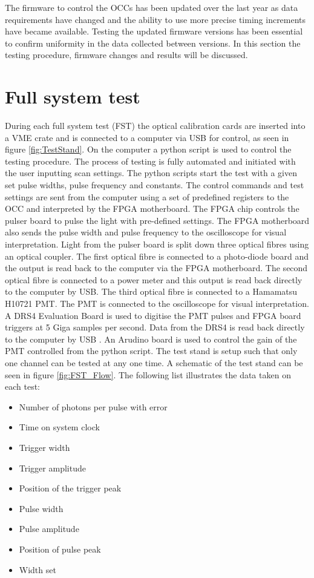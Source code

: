 The firmware to control the OCCs has been updated over the last year as data requirements have changed and the ability to use more precise timing increments have became available. Testing the updated firmware versions has been essential to confirm uniformity in the data collected between versions. In this section the testing procedure, firmware changes and results will be discussed.

\section{Full system test}
During each full system test (FST) the optical calibration cards are inserted into a VME crate and is connected to a computer via USB for control, as seen in figure \ref{fig:TestStand}. On the computer a python script is used to control the testing procedure. The process of testing is fully automated and initiated with the user inputting scan settings. The python scripts start the test with a given set pulse widths, pulse frequency and constants. The control commands and test settings are sent from the computer using a set of predefined registers to the OCC and interpreted by the FPGA motherboard. The FPGA chip controls the pulser board to pulse the light with pre-defined settings. The FPGA motherboard also sends the pulse width and pulse frequency to the oscilloscope for visual interpretation. Light from the pulser board is split down three optical fibres using an optical coupler. The first optical fibre is connected to a photo-diode board and the output is read back to the computer via the FPGA motherboard. The second optical fibre is connected to a power meter and this output is read back directly to the computer by USB. The third optical fibre is connected to a Hamamatsu H10721 PMT. The PMT is connected to the oscilloscope for visual interpretation. A DRS4 Evaluation Board is used to digitise the PMT pulses and FPGA board triggers at 5 Giga samples per second. Data from the DRS4 is read back directly to the computer by USB \cite{DRS4}. An Arudino board is used to control the gain of the PMT controlled from the python script. The test stand is setup such that only one channel can be tested at any one time. A schematic of the test stand can be seen in figure \ref{fig:FST_Flow}. The following list illustrates the data taken on each test:

\begin{itemize}\label{list:FSTdata}
    \item Number of photons per pulse with error
    \item Time on system clock
    \item Trigger width
    \item Trigger amplitude
    \item Position of the trigger peak
    \item Pulse width
    \item Pulse amplitude
    \item Position of pulse peak
    \item Width set
\end{itemize}

